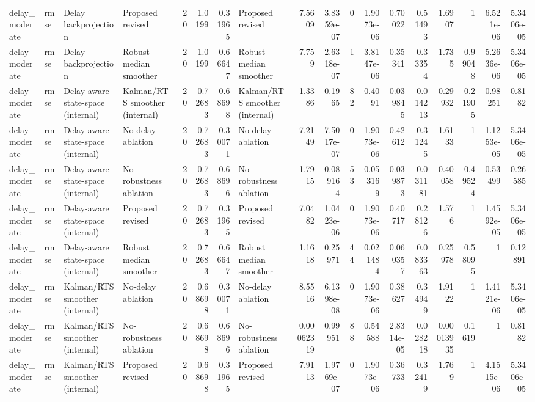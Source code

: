 \begin{table}[!htbp]
{\begin{tabular}{llllrrrlrrrrrrrrrr}
delay_moderate & rmse & Delay backprojection & Proposed revised & 20 & 1.0199 & 0.31965 & Proposed revised & 7.5609 & 3.8359e-07 & 0 & 1.9073e-06 & 0.70022 & 0.51493 & 1.6907 & 1 & 6.521e-06 & 5.3406e-05 \\
delay_moderate & rmse & Delay backprojection & Robust median smoother & 20 & 1.0199 & 0.66647 & Robust median smoother & 7.759 & 2.6318e-07 & 1 & 3.8147e-06 & 0.35341 & 0.33354 & 1.735 & 0.99048 & 5.2636e-06 & 5.3406e-05 \\
delay_moderate & rmse & Delay-aware state-space (internal) & Kalman/RTS smoother (internal) & 20 & 0.72683 & 0.68698 & Kalman/RTS smoother (internal) & 1.3386 & 0.1965 & 82 & 0.4091 & 0.039845 & 0.014213 & 0.29932 & 0.21905 & 0.98251 & 0.8182 \\
delay_moderate & rmse & Delay-aware state-space (internal) & No-delay ablation & 20 & 0.72683 & 0.30071 & No-delay ablation & 7.2149 & 7.5017e-07 & 0 & 1.9073e-06 & 0.42612 & 0.31245 & 1.6133 & 1 & 1.1253e-05 & 5.3406e-05 \\
delay_moderate & rmse & Delay-aware state-space (internal) & No-robustness ablation & 20 & 0.72683 & 0.68696 & No-robustness ablation & 1.7915 & 0.089164 & 53 & 0.053169 & 0.039873 & 0.031181 & 0.40058 & 0.49524 & 0.53499 & 0.26585 \\
delay_moderate & rmse & Delay-aware state-space (internal) & Proposed revised & 20 & 0.72683 & 0.31965 & Proposed revised & 7.0482 & 1.0423e-06 & 0 & 1.9073e-06 & 0.40717 & 0.28126 & 1.576 & 1 & 1.4592e-05 & 5.3406e-05 \\
delay_moderate & rmse & Delay-aware state-space (internal) & Robust median smoother & 20 & 0.72683 & 0.66647 & Robust median smoother & 1.1618 & 0.25971 & 44 & 0.021484 & 0.060357 & 0.083363 & 0.25978 & 0.58095 & 1 & 0.12891 \\
delay_moderate & rmse & Kalman/RTS smoother (internal) & No-delay ablation & 20 & 0.68698 & 0.30071 & No-delay ablation & 8.5516 & 6.1398e-08 & 0 & 1.9073e-06 & 0.38627 & 0.34949 & 1.9122 & 1 & 1.4121e-06 & 5.3406e-05 \\
delay_moderate & rmse & Kalman/RTS smoother (internal) & No-robustness ablation & 20 & 0.68698 & 0.68696 & No-robustness ablation & 0.00062319 & 0.99951 & 88 & 0.54588 & 2.8314e-05 & 0.028218 & 0.00013935 & 0.1619 & 1 & 0.8182 \\
delay_moderate & rmse & Kalman/RTS smoother (internal) & Proposed revised & 20 & 0.68698 & 0.31965 & Proposed revised & 7.9113 & 1.9769e-07 & 0 & 1.9073e-06 & 0.36733 & 0.32419 & 1.769 & 1 & 4.1515e-06 & 5.3406e-05 \\

\end{tabular}}
\end{table}

